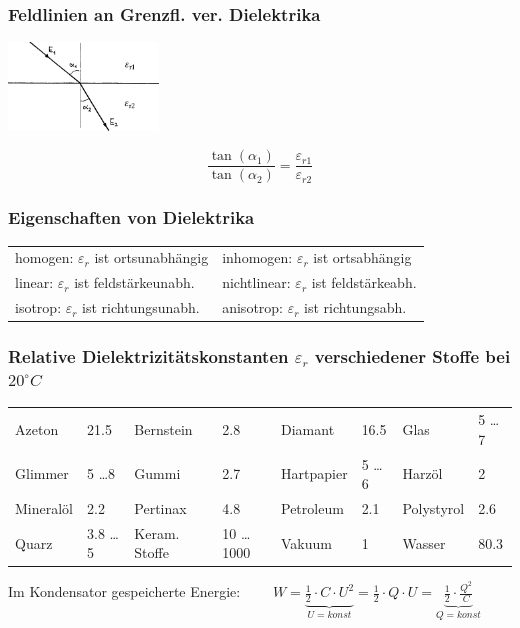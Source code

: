 \parbox[t]{8.7cm} {
	\subsubsection{Feldlinien an Grenzfl. ver. Dielektrika}
	\parbox{4.5cm}{\includegraphics[width=4cm]{./bilder/e-grenzflaechen-dielektrika.png}}
	\parbox{3.5cm}{
	$$ \frac{\tan(\alpha_1)}{\tan(\alpha_2)} = \frac{\varepsilon_{r1}}{\varepsilon_{r2}} $$ }
}
\parbox[t]{9.4cm}{
\subsubsection{Eigenschaften von Dielektrika}
	\begin{tabular}[t]{p{5.2cm} p{4.8cm}}
		homogen: $\varepsilon_r$ ist ortsunabhängig 
			& inhomogen: $\varepsilon_r$ ist ortsabhängig \\
		linear: $\varepsilon_r$ ist feldstärkeunabh. 
			& nichtlinear: $\varepsilon_r$ ist feldstärkeabh. \\ 
		isotrop: $\varepsilon_r$ ist richtungsunabh. 
			& anisotrop: $\varepsilon_r$ ist richtungsabh. 
	\end{tabular}
} 

\subsubsection{Relative Dielektrizitätskonstanten $\varepsilon_r$ verschiedener Stoffe bei $ 20^\circ C $ }
\begin{tabular}[c]{ p{2cm}  p{1.7cm}  p{2.5cm}  p{1.7cm} p{2cm}  p{1.7cm} p{2cm}  p{1.7cm} }
Azeton & 21.5
& Bernstein & 2.8
& Diamant & 16.5
& Glas & 5 \ldots 7 \\
Glimmer & 5 \ldots 8
& Gummi & 2.7
& Hartpapier & 5 \ldots 6
& Harzöl & 2 \\
Mineralöl  & 2.2
& Pertinax  & 4.8
& Petroleum & 2.1
& Polystyrol & 2.6 \\
Quarz & 3.8 \ldots 5
& Keram. Stoffe  & 10 \ldots 1000
& Vakuum & 1
& Wasser & 80.3

\end{tabular}

Im Kondensator gespeicherte Energie: $\qquad\boxed{W = \underbrace{\frac{1}{2} \cdot C \cdot U^2}_{U = konst} = \frac{1}{2} \cdot Q \cdot U = \underbrace{\frac{1}{2} \cdot \frac{Q^2}{C}}_{Q = konst} }$\\

